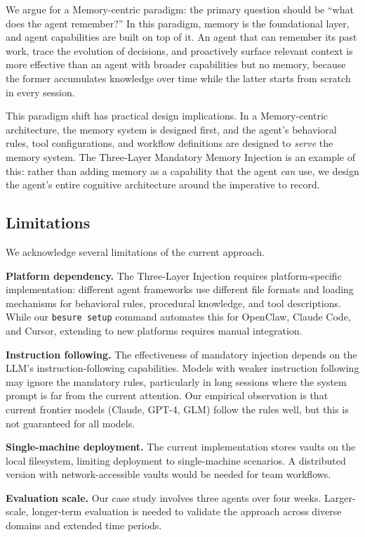 \documentclass[11pt]{article}
\begin{document}
We argue for a Memory-centric paradigm: the primary question should be ``what does the agent remember?'' In this paradigm, memory is the foundational layer, and agent capabilities are built on top of it. An agent that can remember its past work, trace the evolution of decisions, and proactively surface relevant context is more effective than an agent with broader capabilities but no memory, because the former accumulates knowledge over time while the latter starts from scratch in every session.

This paradigm shift has practical design implications. In a Memory-centric architecture, the memory system is designed first, and the agent's behavioral rules, tool configurations, and workflow definitions are designed to \emph{serve} the memory system. The Three-Layer Mandatory Memory Injection is an example of this: rather than adding memory as a capability that the agent \emph{can} use, we design the agent's entire cognitive architecture around the imperative to record.

\subsection{Limitations}

We acknowledge several limitations of the current approach.

\textbf{Platform dependency.} The Three-Layer Injection requires platform-specific implementation: different agent frameworks use different file formats and loading mechanisms for behavioral rules, procedural knowledge, and tool descriptions. While our \texttt{besure setup} command automates this for OpenClaw, Claude Code, and Cursor, extending to new platforms requires manual integration.

\textbf{Instruction following.} The effectiveness of mandatory injection depends on the LLM's instruction-following capabilities. Models with weaker instruction following may ignore the mandatory rules, particularly in long sessions where the system prompt is far from the current attention. Our empirical observation is that current frontier models (Claude, GPT-4, GLM) follow the rules well, but this is not guaranteed for all models.

\textbf{Single-machine deployment.} The current implementation stores vaults on the local filesystem, limiting deployment to single-machine scenarios. A distributed version with network-accessible vaults would be needed for team workflows.

\textbf{Evaluation scale.} Our case study involves three agents over four weeks. Larger-scale, longer-term evaluation is needed to validate the approach across diverse domains and extended time periods.
\end{document}
